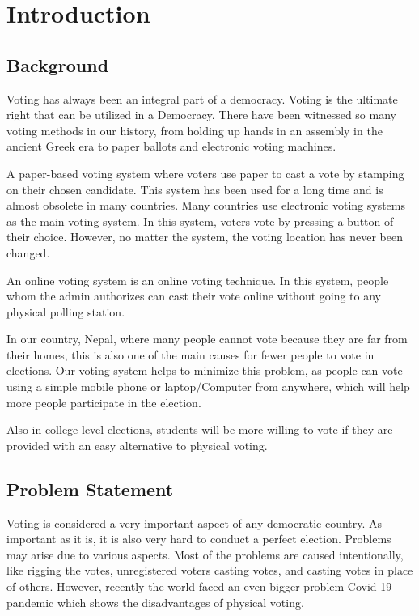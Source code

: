 \documentclass[a4paper,12pt]{report}
\begin{document}

\chapter{Introduction}

\section{Background}
Voting has always been an integral part of a democracy.  Voting is the ultimate right that can be utilized in a Democracy.  There  have been witnessed so many voting methods in our history, from holding up hands in an assembly in the ancient Greek era to paper ballots and electronic voting machines.

A paper-based voting system where voters use paper to cast a vote by stamping on their chosen candidate. This system has been used for a long time and is almost obsolete in many countries. Many countries use electronic voting systems as the main voting system. In this system, voters vote by pressing a button of their choice. However, no matter the system, the voting location has never been changed.

An online voting system is an online voting technique. In this system, people whom the admin authorizes can cast their vote online without going to any physical polling station.
 
In our country, Nepal, where many people cannot vote because they are far from their homes, this is also one of the main causes for fewer people to vote in elections. Our voting system helps to minimize this problem, as people can vote using a simple mobile phone or laptop/Computer from anywhere, which will help more people participate in the election. 
 
Also in college level elections, students will be more willing to vote if  they are provided with an easy alternative to physical voting.

\section{Problem Statement}
Voting is considered a very important aspect of any democratic country. 
As important as it is, it is also very hard to conduct a perfect election. Problems may arise due to various aspects. Most of the problems are caused intentionally, like rigging the votes, unregistered voters casting votes, and casting votes in place of others. However, recently the world faced an even bigger problem Covid-19 pandemic which shows the disadvantages of physical voting.
\end{document}
